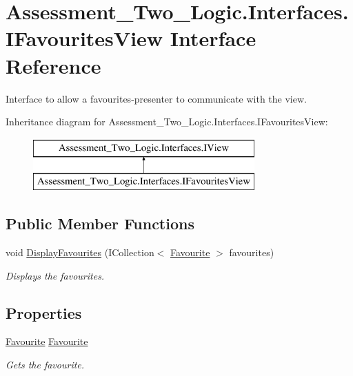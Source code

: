 \hypertarget{interface_assessment___two___logic_1_1_interfaces_1_1_i_favourites_view}{
\section{Assessment\_\-Two\_\-Logic.Interfaces.IFavouritesView Interface Reference}
\label{interface_assessment___two___logic_1_1_interfaces_1_1_i_favourites_view}
}


Interface to allow a favourites-\/presenter to communicate with the view.  


Inheritance diagram for Assessment\_\-Two\_\-Logic.Interfaces.IFavouritesView:\begin{figure}[H]
\begin{center}
\leavevmode
\includegraphics[height=2.000000cm]{interface_assessment___two___logic_1_1_interfaces_1_1_i_favourites_view}
\end{center}
\end{figure}
\subsection*{Public Member Functions}
\begin{DoxyCompactItemize}
\item 
void \hyperlink{interface_assessment___two___logic_1_1_interfaces_1_1_i_favourites_view_a705c46c4bae7c0af9e2d81f343e10a01}{DisplayFavourites} (ICollection$<$ \hyperlink{class_assessment___two___logic_1_1_model_1_1_favourite}{Favourite} $>$ favourites)
\begin{DoxyCompactList}\small\item\em Displays the favourites. \item\end{DoxyCompactList}\end{DoxyCompactItemize}
\subsection*{Properties}
\begin{DoxyCompactItemize}
\item 
\hyperlink{class_assessment___two___logic_1_1_model_1_1_favourite}{Favourite} \hyperlink{interface_assessment___two___logic_1_1_interfaces_1_1_i_favourites_view_a479002730da5dcd350dab7ab6e8316bb}{Favourite}
\begin{DoxyCompactList}\small\item\em Gets the favourite. \item\end{DoxyCompactList}\end{DoxyCompactItemize}



